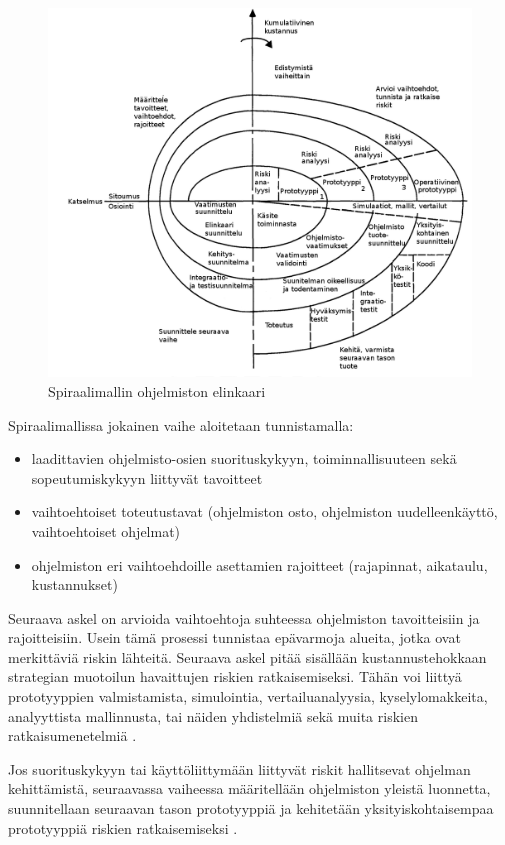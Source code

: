 \documentclass[finnish]{tktltiki2}
\theoremstyle{definition}
\theoremstyle{remark}
\begin{document}
\begin{figure}[h!]

\caption{Spiraalimallin ohjelmiston elinkaari}
\centering
\includegraphics[width=\textwidth]{spiral}
\end{figure}

Spiraalimallissa jokainen vaihe aloitetaan tunnistamalla: \cite{BOE88}

\begin{itemize}
\item laadittavien ohjelmisto-osien suorituskykyyn, toiminnallisuuteen sekä sopeutumiskykyyn liittyvät tavoitteet
\item vaihtoehtoiset toteutustavat (ohjelmiston osto, ohjelmiston uudelleenkäyttö, vaihtoehtoiset ohjelmat)
\item ohjelmiston eri vaihtoehdoille asettamien rajoitteet (rajapinnat, aikataulu, kustannukset)
\end{itemize}

Seuraava askel on arvioida vaihtoehtoja suhteessa ohjelmiston tavoitteisiin ja rajoitteisiin. Usein tämä prosessi tunnistaa epävarmoja alueita, jotka ovat merkittäviä riskin lähteitä. Seuraava askel pitää sisällään kustannustehokkaan strategian muotoilun havaittujen riskien ratkaisemiseksi. Tähän voi liittyä prototyyppien valmistamista, simulointia, vertailuanalyysia, kyselylomakkeita, analyyttista mallinnusta, tai näiden yhdistelmiä sekä muita riskien ratkaisumenetelmiä \cite{BOE88}.

Jos suorituskykyyn tai käyttöliittymään liittyvät riskit hallitsevat ohjelman kehittämistä, seuraavassa vaiheessa määritellään ohjelmiston yleistä luonnetta, suunnitellaan seuraavan tason prototyyppiä ja kehitetään yksityiskohtaisempaa prototyyppiä riskien ratkaisemiseksi \cite{BOE88}.
\end{document}

